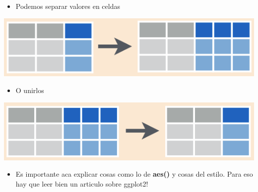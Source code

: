 \documentclass[ignorenonframetext,]{beamer}
\providecommand{\tightlist}{%
  \setlength{\itemsep}{0pt}\setlength{\parskip}{0pt}}
\begin{document}
\begin{frame}{}
\protect\hypertarget{section-7}{}


\begin{itemize}
\tightlist
\item
  Podemos separar valores en celdas
\end{itemize}

\begin{center}\includegraphics[width=0.6\linewidth]{tidyr_separate} \end{center}

\begin{itemize}
\tightlist
\item
  O unirlos
\end{itemize}

\begin{center}\includegraphics[width=0.6\linewidth]{tidyr_unite} \end{center}

\end{frame}

\begin{frame}{}
\protect\hypertarget{section-8}{}


\begin{itemize}
\tightlist
\item
  Es importante aca explicar cosas como lo de \textbf{aes()} y cosas del
  estilo. Para eso hay que leer bien un articulo sobre ggplot2!
\end{itemize}

\end{frame}
\end{document}
